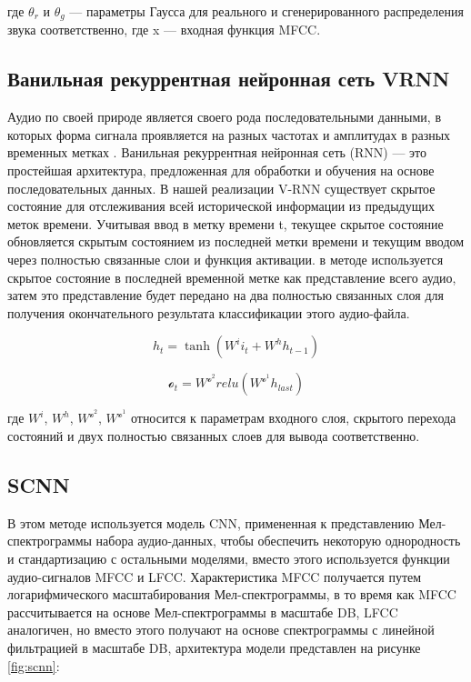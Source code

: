 где \(\theta_r\) и \(\theta_g\) — параметры Гаусса для реального и сгенерированного распределения звука соответственно, где x — входная функция MFCC.

\subsection{Ванильная рекуррентная нейронная сеть VRNN}

Аудио по своей природе является своего рода последовательными данными, в которых форма сигнала проявляется на разных частотах и амплитудах в разных временных метках \cite{2019-replay}. Ванильная рекуррентная нейронная сеть (RNN) — это простейшая архитектура, предложенная для обработки и обучения на основе последовательных данных. В нашей реализации V-RNN существует скрытое состояние для отслеживания всей исторической информации из предыдущих меток времени. Учитывая ввод в метку времени t, текущее скрытое состояние обновляется скрытым состоянием из последней метки времени и текущим вводом через полностью связанные слои и функция активации. в методе используется скрытое состояние в последней временной метке как представление всего аудио, затем это представление будет передано на два полностью связанных слоя для получения окончательного результата классификации этого аудио-файла.

\begin{equation}
    h_t = \tanh (W^i i_t + W^h h_{t - 1})
\end{equation}

\begin{equation}
    \mathscr{o}_t = W^\mathscr{o}^2 relu(W^\mathscr{o}^1 h_{last})
\end{equation}

где \(W^i\), \(W^h\), \(W^\mathscr{o}^2\), \(W^\mathscr{o}^1\) относится к параметрам входного слоя, скрытого перехода состояний и двух полностью связанных слоев для вывода соответственно.

\subsection{SCNN}

В этом методе используется модель CNN, примененная к представлению Мел-спектрограммы набора аудио-данных, чтобы обеспечить некоторую однородность и стандартизацию с остальными моделями, вместо этого используется функции аудио-сигналов MFCC и LFCC. Характеристика MFCC получается путем логарифмического масштабирования Мел-спектрограммы, в то время как MFCC рассчитывается на основе Мел-спектрограммы в масштабе DB, LFCC аналогичен, но вместо этого получают на основе спектрограммы с линейной фильтрацией в масштабе DB, архитектура модели представлен на рисунке \ref{fig:scnn}:

